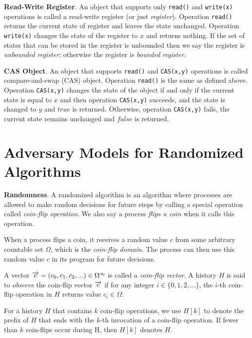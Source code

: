 \textbf{Read-Write Register}.
An object that supports only \texttt{read()} and \texttt{write(x)} operations is called
a read-write register (or just \emph{register}). Operation \texttt{read()} returns the current state of register and
leaves the state unchanged. Operation \texttt{write(x)} changes the state of the register to $x$ and returns nothing.
If the set of states that can be stored in the register is unbounded then we say the register is \emph{unbounded register};
otherwise the register is \emph{bounded register}.

\textbf{CAS Object}. An object that supports \texttt{read()} and \texttt{CAS(x,y)} operations is called compare-and-swap (CAS) object.
Operation \texttt{read()} is the same as defined above. Operation \texttt{CAS(x,y)} changes the state of
the object if and only if the current state is equal to $x$ and then operation \texttt{CAS(x,y)} succeeds, and the state is changed
to $y$ and $true$ is returned. Otherwise, operation \texttt{CAS(x,y)} fails, the current state remains unchanged and
$false$ is returned.

\section{Adversary Models for Randomized Algorithms}

\textbf{Randomness}.
A randomized algorithm is an algorithm where processes are allowed to make random decisions for future steps
by calling a special operation called \emph{coin-flip operation}. We also say a process \emph{flips a coin}
when it calls this operation.

When a process flips a coin, it receives a random value $c$ from some arbitrary countable set $\Omega$,
which is the \emph{coin-flip domain}. The process can then use this random value $c$ in its program for future decisions.

A vector $\overrightarrow{\rm c} = (c_0, c_1, c_2,...) \in \Omega^{\infty}$ is called a \emph{coin-flip vector}.
A history $H$ is said to \emph{observe} the coin-flip vector $\overrightarrow{\rm c}$ if
for any integer $i \in \{0, 1, 2, ...\}$, the $i$-th coin-flip operation in $H$ returns value $c_i \in \Omega$.

For a history $H$ that contains $k$ coin-flip operations, we use $H[k]$ to denote the prefix of $H$
that ends with the $k$-th invocation of a coin-flip operation. If fewer than $k$ coin-flips occur during H, then $H[k]$ denotes $H$.


